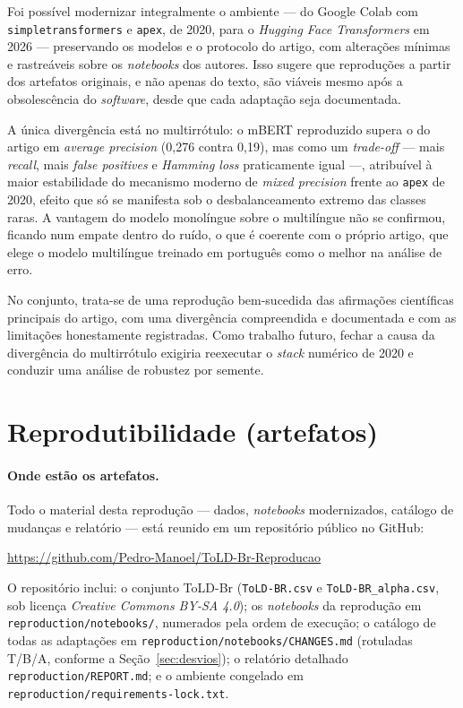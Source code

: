 \documentclass[sigconf, nonacm]{acmart}
\begin{document}
Foi possível modernizar integralmente o ambiente --- do Google Colab com
\texttt{simple\allowbreak{}transformers} e \texttt{apex}, de 2020, para o
\emph{Hugging Face Transformers} em 2026 --- preservando os modelos e o
protocolo do artigo, com alterações mínimas e rastreáveis sobre os
\emph{notebooks} dos autores. Isso sugere que reproduções a partir dos
artefatos originais, e não apenas do texto, são viáveis mesmo após a
obsolescência do \emph{software}, desde que cada adaptação seja documentada.
 
A única divergência está no multirrótulo: o mBERT reproduzido supera o do
artigo em \emph{average precision} (0,276 contra 0,19), mas como um
\emph{trade-off} --- mais \emph{recall}, mais \emph{false positives} e \emph{Hamming
loss} praticamente igual ---, atribuível à maior estabilidade do mecanismo
moderno de \emph{mixed precision} frente ao \texttt{apex} de 2020, efeito que só se
manifesta sob o desbalanceamento extremo das classes raras. A vantagem do
modelo monolíngue sobre o multilíngue não se confirmou, ficando num empate
dentro do ruído, o que é coerente com o próprio artigo, que elege o modelo
multilíngue treinado em português como o melhor na análise de erro.
 
No conjunto, trata-se de uma reprodução bem-sucedida das afirmações
científicas principais do artigo, com uma divergência compreendida e
documentada e com as limitações honestamente registradas. Como trabalho
futuro, fechar a causa da divergência do multirrótulo exigiria reexecutar o
\emph{stack} numérico de 2020 e conduzir uma análise de robustez por
semente.

\section{Reprodutibilidade (artefatos)}
\label{sec:reprodutibilidade}

\paragraph{Onde estão os artefatos.} Todo o material desta reprodução --- dados,
\emph{notebooks} modernizados, catálogo de mudanças e relatório --- está reunido em um
repositório público no GitHub:
\begin{center}
\url{https://github.com/Pedro-Manoel/ToLD-Br-Reproducao}
\end{center}
O repositório inclui: o conjunto ToLD-Br (\texttt{ToLD-BR.csv} e
\texttt{ToLD-BR\_alpha.csv}, sob licença \emph{Creative Commons BY-SA 4.0}); os
\emph{notebooks} da reprodução em \texttt{reproduction/notebooks/}, numerados pela ordem de
execução; o catálogo de todas as adaptações em \texttt{reproduction/notebooks/CHANGES.md}
(rotuladas T/B/A, conforme a Seção~\ref{sec:desvios}); o relatório detalhado
\texttt{reproduction/REPORT.md}; e o ambiente congelado em
\texttt{reproduction/requirements\allowbreak-lock.txt}.
\end{document}

